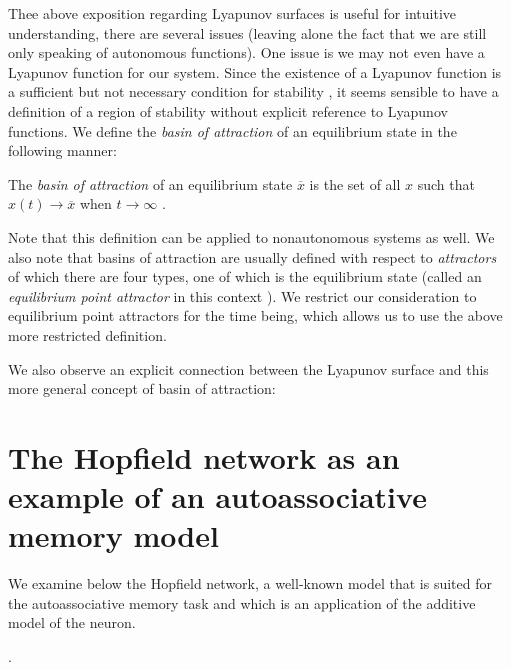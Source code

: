 Thee above exposition regarding Lyapunov surfaces is useful for intuitive understanding, there are several issues (leaving alone the fact that we are still only speaking of autonomous functions). One issue is we may not even have a Lyapunov function for our system. Since the existence of a Lyapunov function is a sufficient but not necessary condition for stability \cite[p. 683]{Haykin:2009:NNC:1213811}, it seems sensible to have a definition of a region of stability without explicit reference to Lyapunov functions. We define the \emph{basin of attraction} of an equilibrium state in the following manner:

\begin{definition}
The \emph{basin of attraction} of an equilibrium state $\overline{x}$ is the set of all $x$ such that $x(t) \to \overline{x}$ when $t \to \infty$ \cite{ocostin}.
\end{definition}

Note that this definition can be applied to nonautonomous systems as well. We also note that basins of attraction are usually defined with respect to \emph{attractors} of which there are four types, one of which is the equilibrium state (called an \emph{equilibrium point attractor} in this context \cite[p. 179]{DBLP:journals/ai/Beer95}). We restrict our consideration to equilibrium point attractors for the time being, which allows us to use the above more restricted definition.

We also observe an explicit connection between the Lyapunov surface and this more general concept of basin of attraction: 

\section{The Hopfield network as an example of an autoassociative memory model}

We examine below the Hopfield network, a well-known model that is suited for the autoassociative memory task and which is an application of the additive model of the neuron.

\cite{Yegnanarayana:2004:ANN:1197006}.

